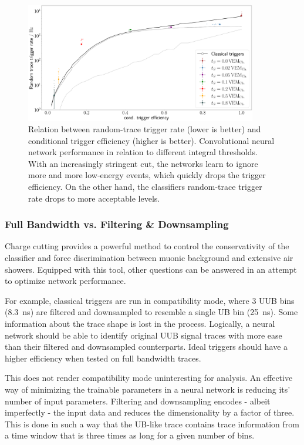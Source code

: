 \begin{figure}
	\centering
	\includegraphics[width=0.9\textwidth]{./plots/CNN_charge_cut.png}
	\caption{Relation between random-trace trigger rate (lower is better) and conditional trigger efficiency (higher is better). Convolutional neural network 
	performance in relation to different integral thresholds. With an increasingly stringent cut, the networks learn to ignore more and more low-energy events, 
	which quickly drops the trigger efficiency. On the other hand, the classifiers random-trace trigger rate drops to more acceptable levels.}
	\label{fig:CNN-charge-cut}
\end{figure}

\subsubsection{Full Bandwidth vs. Filtering \& Downsampling}
\label{sssec:full-bandwidth-filtering-downsampling}

Charge cutting provides a powerful method to control the conservativity of the classifier and force discrimination between muonic background and extensive air 
showers. Equipped with this tool, other questions can be answered in an attempt to optimize network performance.

For example, classical triggers are run in compatibility mode, where 3 UUB bins (\SI{8.3}{\nano\second}) are filtered and downsampled to resemble a single UB bin 
(\SI{25}{\nano\second}). Some information about the trace shape is lost in the process. Logically, a neural network should be able to identify original UUB signal 
traces with more ease than their filtered and downsampled counterparts. Ideal triggers should have a higher efficiency when tested on full bandwidth traces.

This does not render compatibility mode uninteresting for analysis. An effective way of minimizing the trainable parameters in a neural network is reducing its' 
number of input parameters. Filtering and downsampling encodes - albeit imperfectly - the input data and reduces the dimensionality by a factor of three. This is
done in such a way that the UB-like trace contains trace information from a time window that is three times as long for a given number of bins.

